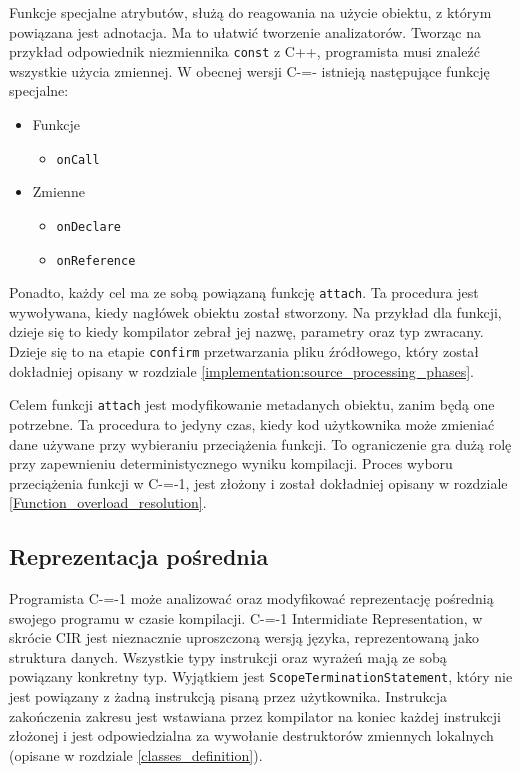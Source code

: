 Funkcje specjalne atrybutów, służą do reagowania na użycie obiektu, z którym powiązana jest adnotacja.
Ma to ułatwić tworzenie analizatorów.
Tworząc na przykład odpowiednik niezmiennika \lstinline{const} z C++, programista musi znaleźć wszystkie użycia zmiennej.
W obecnej wersji C-=- istnieją następujące funkcję specjalne:
\begin{itemize}
	\item Funkcje\begin{itemize}
		\item \lstinline{onCall}
	\end{itemize}
	\item Zmienne\begin{itemize}
		\item \lstinline{onDeclare}
		\item \lstinline{onReference}
	\end{itemize}
\end{itemize}
Ponadto, każdy cel ma ze sobą powiązaną funkcję \lstinline{attach}.
Ta procedura jest wywoływana, kiedy nagłówek obiektu został stworzony.
Na przykład dla funkcji, dzieje się to kiedy kompilator zebrał jej nazwę, parametry oraz typ zwracany.
Dzieje się to na etapie \lstinline{confirm} przetwarzania pliku źródłowego, który został dokładniej opisany w rozdziale \ref{implementation:source_processing_phases}.

Celem funkcji \lstinline{attach} jest modyfikowanie metadanych obiektu, zanim będą one potrzebne.
Ta procedura to jedyny czas, kiedy kod użytkownika może zmieniać dane używane przy wybieraniu przeciążenia funkcji.
To ograniczenie gra dużą rolę przy zapewnieniu deterministycznego wyniku kompilacji.
Proces wyboru przeciążenia funkcji w C-=-1, jest złożony i został dokładniej opisany w rozdziale \ref{Function_overload_resolution}.


\subsection{Reprezentacja pośrednia}\label{reprezentacja_posrednia}
Programista C-=-1 może analizować oraz modyfikować reprezentację pośrednią swojego programu w czasie kompilacji.
C-=-1 Intermidiate Representation, w skrócie CIR jest nieznacznie uproszczoną wersją języka, reprezentowaną jako struktura danych.
Wszystkie typy instrukcji oraz wyrażeń mają ze sobą powiązany konkretny typ.
Wyjątkiem jest \lstinline{ScopeTerminationStatement}, który nie jest powiązany z żadną instrukcją pisaną przez użytkownika.
Instrukcja zakończenia zakresu jest wstawiana przez kompilator na koniec każdej instrukcji złożonej i jest odpowiedzialna za wywołanie destruktorów zmiennych lokalnych (opisane w rozdziale \ref{classes_definition}).


